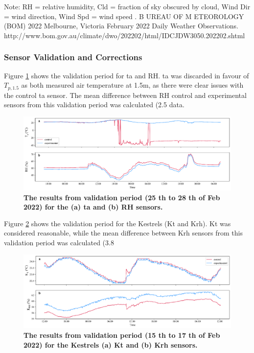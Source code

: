 \documentclass[final,3p,times,authoryear]{elsarticle}
\begin{document}
Note: RH = relative humidity, Cld = fraction of sky obscured by cloud, Wind Dir = wind direction,
Wind Spd = wind speed .
B UREAU OF M ETEOROLOGY (BOM) 2022 Melbourne, Victoria February 2022 Daily Weather
Observations.
http://www.bom.gov.au/climate/dwo/202202/html/IDCJDW3050.202202.shtml





\subsubsection{Sensor Validation and Corrections}\label{sec:appendix7.3}

Figure \ref{fig:7.3} shows the validation period for \gls{ta} and RH. \gls{ta} was discarded in favour of
$T_{p,1.5}$ as both measured air temperature at 1.5m, as there were clear issues with the
control \gls{ta} sensor. The mean difference between RH control and experimental sensors
from this validation period was calculated (2.5 %
data.

\begin{figure}
\centering
\includegraphics[trim={0 0 0 0},clip,scale=1.0]{pict018.png}
\caption{\bf The results from validation period (25 th to 28 th of Feb 2022) for the (a) \gls{ta} and (b) RH sensors.}
 \label{fig:7.3}
\end{figure}

Figure \ref{fig:7.4} shows the validation period for the Kestrels (\gls{Kt} and \gls{Krh}). \gls{Kt} was considered
reasonable, while the mean difference between \gls{Krh} sensors from this validation period
was calculated (3.8 %

\begin{figure}
\centering
\includegraphics[trim={0 0 0 0},clip,scale=1.0]{pict019.png}
\caption{\bf The results from validation period (15 th to 17 th of Feb 2022) for the Kestrels (a) \gls{Kt} and (b)
\gls{Krh} sensors.}
 \label{fig:7.4}
\end{figure}
\end{document}
